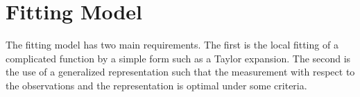 \documentclass{article}
\theoremstyle{remark}
\begin{document}
%
\section{Fitting Model}
The fitting model has two main requirements. The first is the local fitting of a complicated function by a simple form such as a Taylor expansion. The second is the use of a generalized representation such that the measurement with respect to the observations and the representation is optimal under some criteria.  
\end{document}

